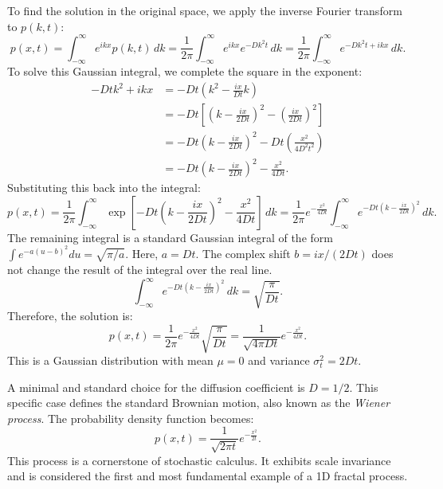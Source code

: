 To find the solution in the original space, we apply the inverse Fourier transform to $p(k,t)$:
\begin{equation}
p(x,t) = \int_{-\infty}^{\infty} e^{ikx} p(k,t) \,dk = \frac{1}{2\pi} \int_{-\infty}^{\infty} e^{ikx} e^{-Dk^2 t} \,dk = \frac{1}{2\pi} \int_{-\infty}^{\infty} e^{-Dk^2 t + ikx} \,dk.
\end{equation}
To solve this Gaussian integral, we complete the square in the exponent:
\begin{equation}\begin{split}
-Dtk^2 + ikx &= -Dt \left( k^2 - \frac{ix}{Dt}k \right) \\
             &= -Dt \left[ \left( k - \frac{ix}{2Dt} \right)^2 - \left( \frac{ix}{2Dt} \right)^2 \right] \\
             &= -Dt \left( k - \frac{ix}{2Dt} \right)^2 - Dt \left( \frac{x^2}{4D^2t^2} \right) \\
             &= -Dt \left( k - \frac{ix}{2Dt} \right)^2 - \frac{x^2}{4Dt}.
\end{split}\end{equation}
Substituting this back into the integral:
\begin{equation}
p(x,t) = \frac{1}{2\pi} \int_{-\infty}^{\infty} \exp\left[-Dt\left(k - \frac{ix}{2Dt}\right)^2 - \frac{x^2}{4Dt}\right] \,dk = \frac{1}{2\pi} e^{-\frac{x^2}{4Dt}} \int_{-\infty}^{\infty} e^{-Dt\left(k - \frac{ix}{2Dt}\right)^2} \,dk.
\end{equation}
The remaining integral is a standard Gaussian integral of the form $\int e^{-a(u-b)^2}du = \sqrt{\pi/a}$. Here, $a=Dt$. The complex shift $b=ix/(2Dt)$ does not change the result of the integral over the real line.
\begin{equation}
\int_{-\infty}^{\infty} e^{-Dt\left(k - \frac{ix}{2Dt}\right)^2} \,dk = \sqrt{\frac{\pi}{Dt}}.
\end{equation}
Therefore, the solution is:
\begin{equation}
p(x,t) = \frac{1}{2\pi} e^{-\frac{x^2}{4Dt}} \sqrt{\frac{\pi}{Dt}} = \frac{1}{\sqrt{4\pi Dt}} e^{-\frac{x^2}{4Dt}}.
\end{equation}
This is a Gaussian distribution with mean $\mu=0$ and variance $\sigma^2_t = 2Dt$.

A minimal and standard choice for the diffusion coefficient is $D=1/2$. This specific case defines the standard Brownian motion, also known as the \emph{Wiener process}. The probability density function becomes:
\begin{equation}
p(x,t) = \frac{1}{\sqrt{2\pi t}} e^{-\frac{x^2}{2t}}.
\end{equation}
This process is a cornerstone of stochastic calculus. It exhibits scale invariance and is considered the first and most fundamental example of a 1D fractal process.


